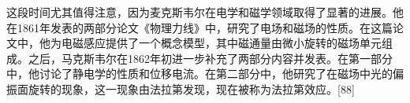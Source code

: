 这段时间尤其值得注意，因为麦克斯韦尔在电学和磁学领域取得了显著的进展。他在1861年发表的两部分论文《物理力线》中，研究了电场和磁场的性质。在这篇论文中，他为电磁感应提供了一个概念模型，其中磁通量由微小旋转的磁场单元组成。之后，马克斯韦尔在1862年初进一步补充了两部分内容并发表。在第一部分中，他讨论了静电学的性质和位移电流。在第二部分中，他研究了在磁场中光的偏振面旋转的现象，这一现象由法拉第发现，现在被称为法拉第效应。[88]